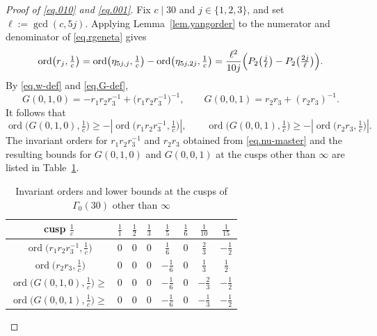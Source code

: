 \documentclass{amsart}
\theoremstyle{definition}
\DeclareMathOperator{\ord}{ord}
\begin{document}
{{\begin{proof}[Proof of \eqref{eq.010} and \eqref{eq.001}]
Fix $c\mid30$ and $j\in\{1,2,3\}$, and set $\ell:=\gcd(c,5j)$.
Applying Lemma~\ref{lem.yangorder} to the numerator and denominator of
\eqref{eq.rgeneta} gives
\begin{equation}
\ord\bigl(r_{j},\tfrac1c\bigr)
=\ord\bigl(\eta_{5j,j},\tfrac1c\bigr)-\ord\bigl(\eta_{5j,2j},\tfrac1c\bigr)
=\frac{\ell^{2}}{10j}
\Bigl(P_{2}\bigl(\tfrac{j}{\ell}\bigr)-P_{2}\bigl(\tfrac{2j}{\ell}\bigr)\Bigr).
\label{eq.nu-master}
\end{equation}
By \eqref{eq.w-def} and \eqref{eq.G-def},
\begin{equation*}
G(0,1,0)=-r_{1}r_{2}r_{3}^{-1}+\bigl(r_{1}r_{2}r_{3}^{-1}\bigr)^{-1},
\qquad
G(0,0,1)=r_{2}r_{3}+(r_{2}r_{3})^{-1}.
\end{equation*}
It follows that
\begin{equation*}
\ord\bigl(G(0,1,0),\tfrac1c\bigr)
\geq-\left|\ord\bigl(r_1r_2r_3^{-1},\tfrac1c\bigr)\right|,
\qquad
\ord\bigl(G(0,0,1),\tfrac1c\bigr)
\geq-\left|\ord\bigl(r_2r_3,\tfrac1c\bigr)\right|.
\end{equation*}
The  invariant orders for $r_{1}r_{2}r_{3}^{-1}$ and $r_{2}r_{3}$ obtained from \eqref{eq.nu-master} and the resulting bounds for $G(0,1,0)$ and $G(0,0,1)$ at the cusps other than $\infty$ are listed in Table~\ref{tab.rorders}.	

\begin{table}[H]
\centering
\renewcommand{\arraystretch}{1.25}
\begin{tabular}{|c||c|c|c|c|c|c|c|}
\hline
cusp $\tfrac1c$ & $\tfrac11$ & $\tfrac12$ & $\tfrac13$ & $\tfrac15$
& $\tfrac16$ & $\tfrac1{10}$ & $\tfrac1{15}$\\
\hline
$\ord\bigl(r_1r_2r_3^{-1},\tfrac1c\bigr)$ & $0$ & $0$ & $0$
& $\tfrac16$ & $0$ & $\tfrac23$ & $-\tfrac12$\\
$\ord\bigl(r_2r_3,\tfrac1c\bigr)$ & $0$ & $0$ & $0$
& $-\tfrac16$ & $0$ & $\tfrac13$ & $\tfrac12$\\
\hline
$\ord\bigl(G(0,1,0),\tfrac1c\bigr)\ge$ & $0$ & $0$ & $0$
& $-\tfrac16$ & $0$ & $-\tfrac23$ & $-\tfrac12$\\
$\ord\bigl(G(0,0,1),\tfrac1c\bigr)\ge$ & $0$ & $0$ & $0$
& $-\tfrac16$ & $0$ & $-\tfrac13$ & $-\tfrac12$\\
\hline
\end{tabular}
\caption{Invariant orders and lower bounds at the cusps of $\Gamma_0(30)$ other than $\infty$}
\label{tab.rorders}
\end{table}


\end{proof}}}
\end{document}

